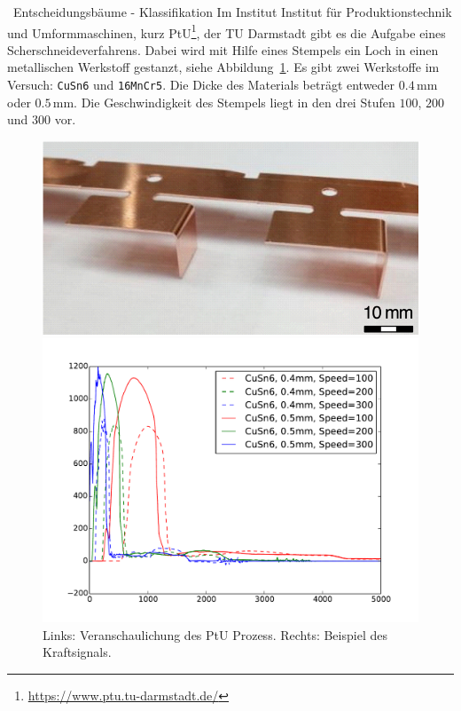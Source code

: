 \begin{task}[credit=4]{\codesym~Entscheidungsbäume - Klassifikation}
\label{t:dt_classification}
Im Institut Institut für Produktionstechnik und Umformmaschinen, kurz PtU\footnote{\url{https://www.ptu.tu-darmstadt.de/}}, der TU Darmstadt gibt es die Aufgabe eines Scherschneideverfahrens. Dabei wird mit Hilfe eines Stempels ein Loch in einen metallischen Werkstoff gestanzt, siehe Abbildung~\ref{fig:shearcutting}. Es gibt zwei Werkstoffe im Versuch: \texttt{CuSn6} und \texttt{16MnCr5}. Die Dicke des Materials beträgt entweder $0.4$\,mm oder $0.5$\,mm. Die Geschwindigkeit des Stempels liegt in den drei Stufen $100$, $200$ und $300$ vor.

\begin{figure}[h!]{
  \begin{minipage}{0.45\linewidth}
  \includegraphics[width=\linewidth]{media/images/example.png}
  \end{minipage}
  \begin{minipage}{0.45\linewidth}
  \includegraphics[width=\linewidth]{media/images/signal.pdf}%
  \end{minipage}}
  \caption{Links: Veranschaulichung des PtU Prozess. Rechts: Beispiel des Kraftsignals.}
  \label{fig:shearcutting}
 \end{figure}
 

\end{task}
